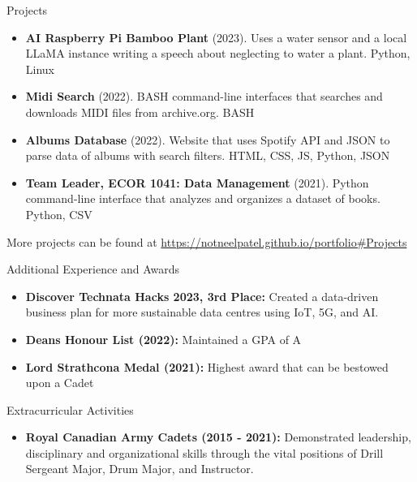 \documentclass[]{mcdowellcv}
\begin{document}
	\begin{cvsection}{Projects}
		\begin{cvsubsection}{}{}{}
			\begin{itemize}
				\item \textbf{AI Raspberry Pi Bamboo Plant} (2023). Uses a water sensor and a local LLaMA instance writing a speech about neglecting to water a plant. Python, Linux
				\item \textbf{Midi Search} (2022). BASH command-line interfaces that searches and downloads MIDI files from archive.org. BASH
				\item \textbf{Albums Database} (2022). Website that uses Spotify API and JSON to parse data of albums with search filters. HTML, CSS, JS, Python, JSON
				\item \textbf{Team Leader, ECOR 1041: Data Management} (2021). Python command-line interface that analyzes and organizes a dataset of books. Python, CSV
			\end{itemize}
			
				More projects can be found at \url{https://notneelpatel.github.io/portfolio#Projects}
		\end{cvsubsection}
	\end{cvsection}
	
	\begin{cvsection}{Additional Experience and Awards}
		\begin{cvsubsection}{}{}{}	
			\begin{itemize}
				\item \textbf{Discover Technata Hacks 2023, 3rd Place:} Created a data-driven business plan for more sustainable data centres using IoT, 5G, and AI.  
				\item \textbf {Deans Honour List (2022):} Maintained a GPA of A
				\item \textbf{Lord Strathcona Medal (2021):} Highest award that can be bestowed upon a Cadet
			\end{itemize}
		\end{cvsubsection}
	\end{cvsection}
	
	\begin{cvsection}{Extracurricular Activities}
		\begin{cvsubsection}{}{}{}
			\begin{itemize}
				\item \textbf{Royal Canadian Army Cadets (2015 - 2021):} Demonstrated leadership, disciplinary and organizational skills through the vital positions of Drill Sergeant Major, Drum Major, and Instructor.
			\end{itemize}
		\end{cvsubsection}
	\end{cvsection}
\end{document}
